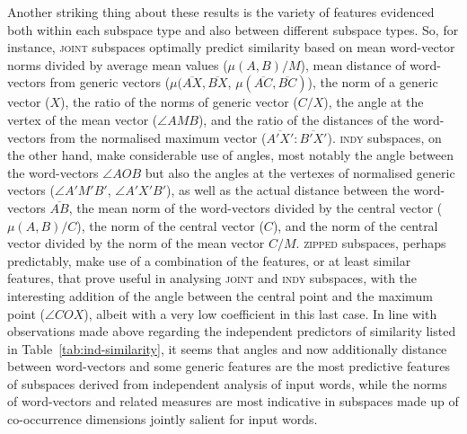 Another striking thing about these results is the variety of features evidenced both within each subspace type and also between different subspace types.  So, for instance, \textsc{joint} subspaces optimally predict similarity based on mean word-vector norms divided by average mean values ($\mu(A,B)/M$), mean distance of word-vectors from generic vectors ($\mu(\overline{AX},\overline{BX}$, $\mu(\overline{AC},\overline{BC})$), the norm of a generic vector ($X$), the ratio of the norms of generic vector ($C/X$), the angle at the vertex of the mean vector ($\angle AMB$), and the ratio of the distances of the word-vectors from the normalised maximum vector ($\overline{A'X'}:\overline{B'X'}$).  \textsc{indy} subspaces, on the other hand, make considerable use of angles, most notably the angle between the word-vectors $\angle AOB$ but also the angles at the vertexes of normalised generic vectors ($\angle A'M'B'$, $\angle A'X'B'$), as well as the actual distance between the word-vectors $\overline{AB}$, the mean norm of the word-vectors divided by the central vector ($\mu (A,B)/C$), the norm of the central vector ($C$), and the norm of the central vector divided by the norm of the mean vector $C/M$.  \textsc{zipped} subspaces, perhaps predictably, make use of a combination of the features, or at least similar features, that prove useful in analysing \textsc{joint} and \textsc{indy} subspaces, with the interesting addition of the angle between the central point and the maximum point ($\angle COX$), albeit with a very low coefficient in this last case.  In line with observations made above regarding the independent predictors of similarity listed in Table~\ref{tab:ind-similarity}, it seems that angles and now additionally distance between word-vectors and some generic features are the most predictive features of subspaces derived from independent analysis of input words, while the norms of word-vectors and related measures are most indicative in subspaces made up of co-occurrence dimensions jointly salient for input words.

